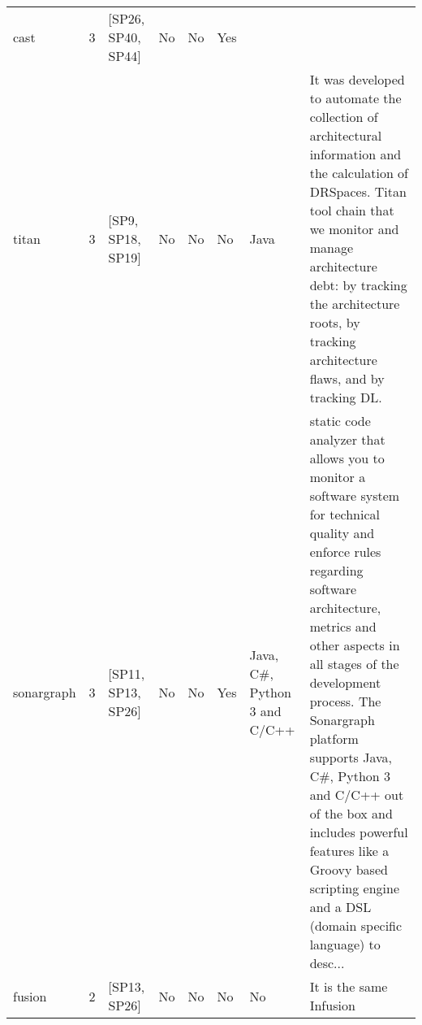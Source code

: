 \begin{tabular}{lrllllll}
                cast &      3 &                                     [SP26, SP40, SP44] &    No &       No &       Yes &                                                                                                                                                                                         &                                                                                                                                                                                                                                                                                                                                                                                                                  \\
               titan &      3 &                                      [SP9, SP18, SP19] &    No &       No &        No &                                                                                                                                                                                    Java &                                                                                                                                                 It was developed to automate the collection of architectural information and the calculation of DRSpaces. Titan tool chain that we monitor and manage architecture debt: by tracking the architecture roots, by tracking architecture flaws, and by tracking DL. \\
          sonargraph &      3 &                                     [SP11, SP13, SP26] &    No &       No &       Yes &                                                                                                                                                            Java, C\#, Python 3 and C/C++ &  static code analyzer that allows you to monitor a software system for technical quality and enforce rules regarding software architecture, metrics and other aspects in all stages of the development process. The Sonargraph platform supports Java, C\#, Python 3 and C/C++ out of the box and includes powerful features like a Groovy based scripting engine and a DSL (domain specific language) to desc... \\
              fusion &      2 &                                           [SP13, SP26] &    No &       No &        No &                                                                                                                                                                                      No &                                                                                                                                                                                                                                                                                                                                                                                          It is the same Infusion \\

\end{tabular}
